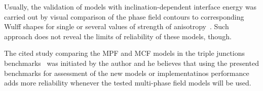 Usually, the validation of models with inclination-dependent interface energy was carried out by visual comparison of the phase field contours to corresponding Wulff shapes for single or several values of strength of anisotropy~\cite{Garcke1999,Eggleston2001,Fleck2011,Ma2006,Tschukin2017}. Such approach does not reveal the limits of reliability of these models, though.

The cited study comparing the MPF and MCF models in the triple junctions benchmarks~\cite{Daubner2023} was initiated by the author and he believes that using the presented benchmarks for assessment of the new models or implementatinos performance adds more reliability whenever the tested multi-phase field models will be used.

\cleardoublepage

